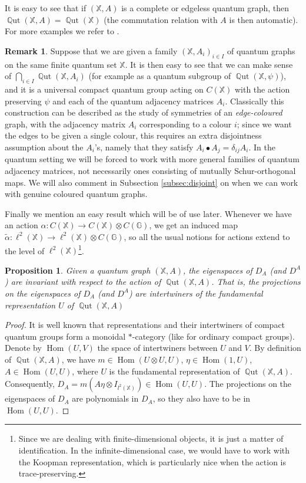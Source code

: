 \documentclass[12pt]{amsart}
\newtheorem{prop}[thm]{Proposition}
\theoremstyle{definition}
\theoremstyle{definition}
\theoremstyle{definition}
\theoremstyle{definition}
\newtheorem{remark}[thm]{Remark}
\DeclareMathOperator{\Qut}{\mathbb{Q}ut}
\DeclareMathOperator{\Hom}{Hom}
\newcommand{\G}{\mathbb{G}}
\newcommand{\X}{\mathbb{X}}
\numberwithin{equation}{section}
\begin{document}
It is easy to see that if $(\X,A)$ is a complete or edgeless quantum graph, then $\Qut(\X,A)= \Qut(\X)$ (the commutation relation with $A$ is then automatic). For more examples we refer to \cite{Gro22}.

\begin{remark} \label{rem:coloured}
Suppose that we are given a family $(\X,A_i)_{i \in I}$ of quantum graphs on the same finite quantum set $\X$. It is then easy to see that we can make sense of $\bigcap_{i \in I} \Qut(\X, A_i)$ (for example as a quantum subgroup of $\Qut(\X, \psi)$), and it is a universal compact quantum group acting on $C(\X)$ with the action preserving $\psi$ and each of the quantum adjacency matrices $A_i$. Classically this construction can be described as the study of symmetries of an \emph{edge-coloured} graph, with the adjacency matrix $A_i$ corresponding to a colour $i$; since we want the edges to be given a single colour, this requires an extra disjointness assumption about the $A_i$'s, namely that they satisfy $A_i\bullet A_j = \delta_{ij} A_i$. In the quantum setting we will be forced to work with more general families of quantum adjacency matrices, not necessarily ones consisting of mutually Schur-orthogonal maps. We will also comment in Subsection \ref{subsec:disjoint} on when we can work with genuine coloured quantum graphs. 
\end{remark}


Finally we mention an easy result which will be of use later. Whenever we have an action $\alpha: C(\X) \to C(\X)\otimes C(\mathbb{G})$, we get an induced map $\widetilde{\alpha}: \ell^{2}(\X) \to \ell^{2}(\X) \otimes C(\G)$, so all the usual notions for actions extend to the level of $\ell^{2}(\X)$\footnote{Since we are dealing with finite-dimensional objects, it is just a matter of identification. 
In the infinite-dimensional case, we would have to work with the Koopman representation, which is particularly nice when the action is trace-preserving.}.

\begin{prop}\label{prop:eigenvalues}
  Given a quantum graph $(\X, A)$, the eigenspaces of $D_A$ (and $D^A$) are invariant with respect to the action of $\Qut(\X, A)$. That is, the projections on the eigenspaces of $D_A$ (and $D^A$) are intertwiners of the fundamental representation $U$ of $\Qut(\X,A)$
\end{prop}
\begin{proof}
It is well known that representations and their intertwiners of compact quantum groups form a monoidal $*$-category (like for ordinary compact groups). Denote by $\Hom(U,V)$ the space of intertwiners between $U$ and $V$. By definition of $\Qut(\X,A)$, we have $m\in\Hom(U\otimes U,U)$, $\eta\in\Hom(1,U)$, $A\in\Hom(U,U)$, where $U$ is the fundamental representation of $\Qut(\X,A)$. Consequently, $D_A=m(A\eta\otimes I_{l^2(\X)})\in\Hom(U,U)$. The projections on the eigenspaces of $D_A$ are polynomials in $D_A$, so they also have to be in $\Hom(U,U)$.
\end{proof}
\end{document}
